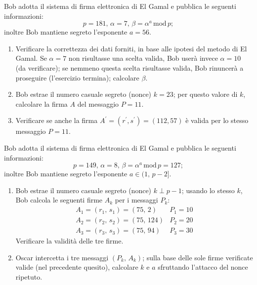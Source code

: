         Bob adotta il sistema di firma elettronica di El Gamal e pubblica le seguenti informazioni: \[
            p=181,\, \alpha = 7,\, \beta = \alpha^a\,\mathrm{mod}\,p
        ;\] inoltre Bob mantiene segreto l'esponente $a=56$.
        \begin{enumerate}
            \item Verificare la correttezza dei dati forniti, in base alle ipotesi del metodo di El Gamal. 
                Se $\alpha=7$ non risultasse una scelta valida, Bob userà invece $\alpha=10$ (da verificare); 
                se nemmeno questa scelta risultasse valida, Bob rinuncerà a proseguire (l'esercizio termina); 
                calcolare $\beta$.
            \item Bob estrae il numero casuale segreto (nonce) $k=23$; per questo valore di $k$, calcolare 
                la firma $A$ del messaggio $P=11$.
            \item Verificare se anche la firma $A^{\prime}=(r^{\prime}, s^{\prime})=(112,57)$ è valida per 
                lo stesso messaggio $P=11$.
        \end{enumerate}

        Bob adotta il sistema di firma elettronica di El Gamal e pubblica le seguenti informazioni: \[
            p=149,\, \alpha = 8,\, \beta = \alpha^a\,\mathrm{mod}\,p=127
        ;\] inoltre Bob mantiene segreto l'esponente $a\in (1,\,p-2]$.
        \begin{enumerate}
            \item Bob estrae il numero casuale segreto (nonce) $k\perp p-1$; usando lo stesso $k$, 
                Bob calcola le seguenti firme $A_k$ per i messaggi $P_k$:
                \[\begin{array}{ll}
                    A_1=(r_1,\,s_1)=(75,\,2) & P_1=10\\
                    A_2=(r_2,\,s_2)=(75,\,124) & P_2=20\\
                    A_3=(r_3,\,s_3)=(75,\,94) & P_3=30
                \end{array}\]
                Verificare la validità delle tre firme.
            \item Oscar intercetta i tre messaggi $(P_k,\,A_k)$; sulla base delle sole firme verificate valide 
                (nel precedente quesito), calcolare $k$ e $a$ sfruttando l'attacco del nonce ripetuto.
        \end{enumerate}

